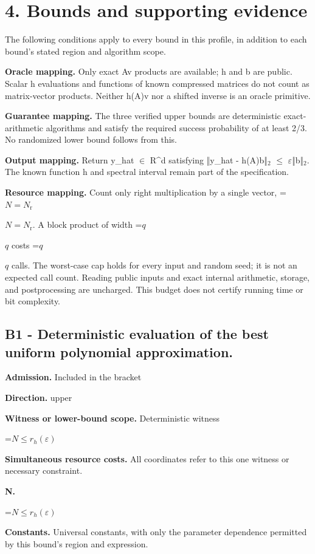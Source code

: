 \documentclass[10pt,a4paper]{article}
\newcommand{\AtlasMath}[1]{\par\begingroup\centering\setbox0=\hbox{$\displaystyle #1$}\ifdim\wd0>1.4\linewidth\typeout{ATLAS WIDE FORMULA: \the\wd0}\fi\ifdim\wd0>\linewidth\resizebox{\linewidth}{!}{\box0}\else\box0\fi\par\endgroup}
\newcommand{\AtlasInlineMath}[1]{\begingroup\setbox0=\hbox{$#1$}\ifdim\wd0>.4\linewidth\endgroup\AtlasMath{#1}\else\endgroup$#1$\fi}
\begin{document}
\section{4. Bounds and supporting evidence}
The following conditions apply to every bound in this profile, in addition to each bound's stated region and algorithm scope.

\textbf{Oracle mapping.} Only exact Av products are available; h and b are public. Scalar h evaluations and functions of known compressed matrices do not count as matrix-vector products. Neither h(A)v nor a shifted inverse is an oracle primitive.

\textbf{Guarantee mapping.} The three verified upper bounds are deterministic exact-arithmetic algorithms and satisfy the required success probability of at least 2/3. No randomized lower bound follows from this.

\textbf{Output mapping.} Return y\_hat $\in$ R\textasciicircum{}d satisfying ‖y\_hat - h(A)b‖$_2$ $\le$ $\varepsilon$‖b‖$_2$. The known function h and spectral interval remain part of the specification.

\textbf{Resource mapping.} Count only right multiplication by a single vector, \AtlasInlineMath{N=N_{\mathrm r}}. A block product of width \AtlasInlineMath{q} costs \AtlasInlineMath{q} calls. The worst-case cap holds for every input and random seed; it is not an expected call count. Reading public inputs and exact internal arithmetic, storage, and postprocessing are uncharged. This budget does not certify running time or bit complexity.

\subsection{B1 - Deterministic evaluation of the best uniform polynomial approximation.}
\textbf{Admission.} Included in the bracket

\textbf{Direction.} upper

\textbf{Witness or lower-bound scope.} Deterministic witness

\AtlasMath{N\le r_h(\varepsilon)}
\textbf{Simultaneous resource costs.} All coordinates refer to this one witness or necessary constraint.

\textbf{N.}

\AtlasMath{N\le r_h(\varepsilon)}
\textbf{Constants.} Universal constants, with only the parameter dependence permitted by this bound’s region and expression.
\end{document}
